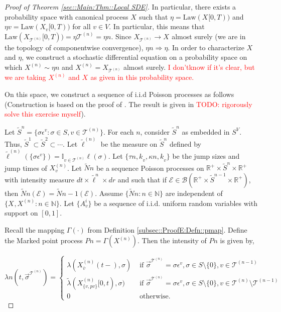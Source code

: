 \documentclass[12pt]{article}
\newcommand{\mb}{\mathbb}
\newcommand{\mc}{\mathcal}
\newcommand{\ms}{\mathscr}
\newcommand{\ra}{\rightarrow}
\newcommand{\ov}{\overline}
\newcommand{\te}{\text}
\newcommand{\ep}{\epsilon}
\newcommand{\tr}{\textcolor{red}}
\newcommand{\ind}{\hspace{24pt}}
\renewcommand{\v}{v}							%
\renewcommand{\S}{S}							%
\newcommand{\s}{\sigma}							%
\newcommand{\sv}{\vec{\s}}						%
\newcommand{\ev}{\ep}							%
\newcommand{\T}{T}								%
\renewcommand{\t}{t}							%
\newcommand{\X}{X}								%
\newcommand{\vind}[1]{^{#1}}					%
\newcommand{\carp}[1]{^{#1}}					%
\newcommand{\vsi}[1]{^{#1}}						%
\newcommand{\cind}[1]{_{#1}}					%
\newcommand{\cl}{\ov}							%
\newcommand{\tp}[1]{(#1)}						%
\newcommand{\tip}[1]{#1}						%
\newcommand{\tree}{\mc{T}}						%
\newcommand{\sln}[1]{^{(#1)}}						%
\newcommand{\poiss}{N}							%
\newcommand{\Sm}{\ell}							%
\newcommand{\rate}{\lambda}						%
\renewcommand{\r}{r}							%
\newcommand{\alt}[1]{\widetilde{#1}}			%
\newcommand{\mmm}{\eta}							%
\newcommand{\law}{\te{Law}}						%
\newcommand{\rt}{\tau}							%
\renewcommand{\it}{k}							%
\newcommand{\evnt}{\mc{E}}						%
\newcommand{\rv}{A}								%
\newcommand{\pmap}{\Gamma}						%
\renewcommand{\mark}{\kappa}					%
\newcommand{\rp}{P}								%
\newcommand{\crate}{\alt{\lambda}}				%
\newcommand{\p}{p}								%
\begin{document}
\begin{proof}[Proof of Theorem \ref{sec::Main:Thm::Local SDE}]
\ind In particular, there exists a probability space with canonical process \(\X\cind{}\tip{}\) such that \(\mmm{}{}{} = \law(\X\cind{}\tip{[0,\T)})\) and \(\mmm{\v}{}{} = \law(\X\cind{\v}\tip{[0,\T)})\) for all \(\v \in V\). In particular, this means that \(\law(\X\cind{\tree\sln{n}}\tip{[0,\T)}) = \mmm{\tree\sln{n}}{}{} = \mmm{}{}{n}\). Since \(\X\cind{\tree\sln{n}}\tip{} \ra \X\cind{}\tip{}\) almost surely (we are in the topology of componentwise convergence), \(\mmm{}{}{n} \Rightarrow \mmm{}{}{}\). In order to characterize \(\X\cind{}\tip{}\) and \(\mmm{}{}{}\), we construct a stochastic differential equation on a probability space on which \(\X\sln{n}\cind{}\tip{} \sim \mmm{}{}{n}\) and \(\X\sln{n}\cind{}\tip{} = \X\cind{\tree\sln{n}}\tip{}\) almost surely. \tr{I don'\t know if it's clear, but we are taking \(\X\sln{n}\cind{}\tip{}\) and \(\X\cind{}\tip{}\) as given in this probability space.}

\ind On this space, we construct a sequence of i.i.d Poisson processes as follows (Construction is based on the proof of \cite[Theorem 14.7.1(b)]{DalVer08}. The result is given in \cite[Exercise 14.7.1]{DalVer08} \tr{TODO: rigorously solve this exercise myself}).

\ind Let \(\alt{\S}^n = \{\s\ev\vind{\v}: \s\in\S,\v \in \tree\sln{n}\}\). For each \(n\), consider \(\alt{\S}^n\) as embedded in \(\S\carp{V}\). Thus, \(\alt{\S}^1 \subset \alt{\S}^2 \subset \cdots\). Let \(\alt{\Sm}\sln{n}\) be the measure on \(\alt{\S}^n\) defined by \(\alt{\Sm}\sln{n}(\{\s\ev\vind{\v}\}) = \mb{I}_{\v \in \tree\sln{n}}\Sm(\s)\). Let \(\{\rt{n,\it}_\v,\mark{n,\it}_{\v}\}\) be the jump sizes and jump times of \(\X\sln{n}\cind{\v}\tip{}\). Let \(\alt{\poiss}{n}\) be a sequence Poisson processes on \(\mb{R}^+\times\alt{\S}^n\times \mb{R}^+\) with intensity measure \(d\t\times\alt{\Sm}^n\times d\r\) and such that if \(\evnt{} \in \ms{B}(\mb{R}^+\times\alt{\S}^{n-1}\times \mb{R}^+)\), then \(\alt{\poiss}{n}(\evnt{}) = \alt{\poiss}{n-1}(\evnt{})\). Assume \(\{\alt{\poiss}{n}:n\in\mb{N}\}\) are independent of \(\{\X\cind{}\tip{},\X\sln{n}\cind{}\tip{}:n\in\mb{N}\}\). Let \(\{\rv_{\v}^{i}\}\) be a sequence of i.i.d. uniform random variables with support on \([0,1]\).

\ind Recall the mapping \(\pmap{}(\cdot)\) from Definition \ref{subsec::ProofE:Defn::pmap}. Define the Marked point process \(\rp{n} = \pmap{}(\X\sln{n}\cind{}\tip{})\). Then the intensity of \(\rp{n}\) is given by,

\[\rate{n}(\t,\sv\cind{}\vsi{\tree\sln{n}}) = \begin{cases}
\rate{}(\X\sln{n}\cind{\cl{\v}}\tp{\t-},\s) &\te{ if } \sv\cind{}\vsi{\tree\sln{n}} = \s\ev\vind{\v},\s \in \S\setminus\{0\},\v\in\tree\sln{n-1}\\
\crate{}{}(\X\sln{n}\cind{\{\v,\p{\v}\}}\tip{[0,\t)},\s) &\te{ if } \sv\cind{}\vsi{\tree\sln{n}} = \s\ev\vind{\v},\s\in\S\setminus\{0\},\v\in\tree\sln{n}\setminus\tree\sln{n-1}\\
0 &\te{ otherwise.}
\end{cases}\]


\end{proof}
\end{document}
